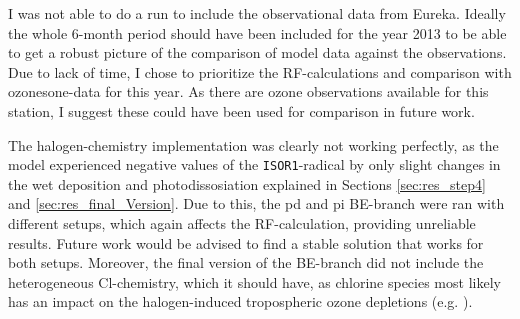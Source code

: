 \medskip
I was not able to do a run to include the observational data from Eureka. Ideally the whole 6-month period should have been included for the year 2013 to be able to get a robust picture of the comparison of model data against the observations. Due to lack of time, I chose to prioritize the RF-calculations and comparison with ozonesone-data for this year. As there are ozone observations available for this station, I suggest these could have been used for comparison in future work. 

\medskip

The halogen-chemistry implementation was clearly not working perfectly, as the model experienced negative values of the \texttt{ISOR1}-radical by only slight changes in the wet deposition and photodissosiation explained in Sections \ref{sec:res_step4} and \ref{sec:res_final_Version}. Due to this, the \acrshort{pd} and \acrshort{pi} BE-branch were ran with different setups, which again affects the RF-calculation, providing unreliable results. Future work would be advised to find a stable solution that works for both setups. Moreover, the final version of the BE-branch did not include the heterogeneous Cl-chemistry, which it should have, as chlorine species most likely has an impact on the halogen-induced tropospheric ozone depletions (e.g. \cite{FinlaysonPitts2010}).